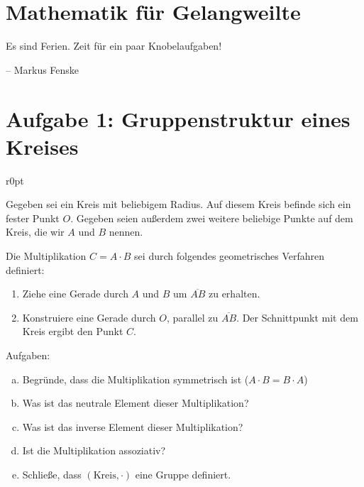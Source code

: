 \documentclass[a4paper,german,12pt,smallheadings]{scrartcl}
\begin{document}
\section*{Mathematik für Gelangweilte}
Es sind Ferien. Zeit für ein paar Knobelaufgaben!

\noindent -- Markus Fenske

\section*{Aufgabe 1: Gruppenstruktur eines Kreises}
\begin{wrapfigure}{r}{0pt}
\end{wrapfigure}

Gegeben sei ein Kreis mit beliebigem Radius. Auf diesem Kreis befinde sich ein
fester Punkt $O$. Gegeben seien außerdem zwei weitere beliebige Punkte auf dem
Kreis, die wir $A$ und $B$ nennen.

\noindent Die Multiplikation $C = A \cdot B$ sei durch folgendes geometrisches Verfahren
definiert:

\begin{enumerate}
  \item Ziehe eine Gerade durch $A$ und $B$ um $\overline{AB}$ zu erhalten.
  \item Konstruiere eine Gerade durch $O$, parallel zu $\overline{AB}$. Der
    Schnittpunkt mit dem Kreis ergibt den Punkt $C$.
\end{enumerate}

\noindent Aufgaben:

\begin{enumerate}[a)]
  \item Begründe, dass die Multiplikation symmetrisch ist ($A \cdot B = B \cdot A$)
  \item Was ist das neutrale Element dieser Multiplikation?
  \item Was ist das inverse Element dieser Multiplikation?
  \item Ist die Multiplikation assoziativ?
  \item Schließe, dass $(\text{Kreis}, \cdot)$ eine Gruppe definiert.
\end{enumerate}

\end{document}
